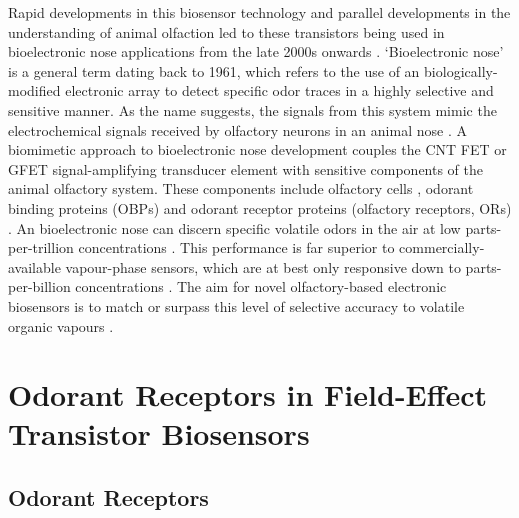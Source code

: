 \documentclass[
  a4paper,
]{scrbook}
\begin{document}
Rapid developments in this biosensor technology and parallel
developments in the understanding of animal olfaction led to these
transistors being used in bioelectronic nose applications from the late
2000s onwards \autocite{Yoon2009,Jin2012,Lee2012b,Park2012}.
`Bioelectronic nose' is a general term dating back to 1961, which refers
to the use of an biologically-modified electronic array to detect
specific odor traces in a highly selective and sensitive manner. As the
name suggests, the signals from this system mimic the electrochemical
signals received by olfactory neurons in an animal nose
\autocite{Glatz2011,Dung2018}. A biomimetic approach to bioelectronic
nose development couples the CNT FET or GFET signal-amplifying
transducer element with sensitive components of the animal olfactory
system. These components include olfactory cells \autocite{Wang2007},
odorant binding proteins (OBPs) \autocite{Larisika2015,Kotlowski2018}
and odorant receptor proteins (olfactory receptors, ORs)
\autocite{Yang2018,Murugathas2020}. An bioelectronic nose can discern
specific volatile odors in the air at low parts-per-trillion
concentrations \autocite{Lee2010,Moon2020}. This performance is far
superior to commercially-available vapour-phase sensors, which are at
best only responsive down to parts-per-billion concentrations
\autocite{GasDetector1,GasDetector2}. The aim for novel olfactory-based
electronic biosensors is to match or surpass this level of selective
accuracy to volatile organic vapours
\autocite{Glatz2011,Kwon2015,Dung2018,Bohbot2020,Kim2022a}.

\hypertarget{sec-odorant-receptors-biosensors}{%
\section{Odorant Receptors in Field-Effect Transistor
Biosensors}\label{sec-odorant-receptors-biosensors}}

\hypertarget{sec-odorant-receptors}{%
\subsection{Odorant Receptors}\label{sec-odorant-receptors}}
\end{document}
